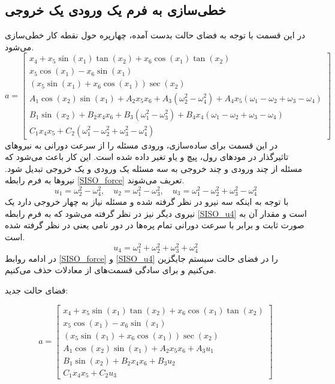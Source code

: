 \subsection{خطی‌سازی به فرم یک ورودی یک خروجی}\label{lin_SISO}
در این قسمت با توجه به فضای حالت بدست آمده، چهارپره حول نقطه کار خطی‌سازی می‌شود.
\begin{equation*}
	a = \begin{bmatrix}
		x_4 + x_5\sin(x_1)\tan(x_2) + x_6\cos(x_1)\tan(x_2)\\
		x_5\cos(x_1)- x_6\sin(x_1)\\
		(x_5\sin(x_1) + x_6\cos(x_1))\sec(x_2)\\
		A_1\cos(x_2)\sin(x_1) + 
		A_2x_5x_6 + A_3\left(\omega_2^2-\omega_4^2\right)+
		A_4x_5\left(\omega_1-\omega_2+\omega_3-\omega_4\right)\\
		B_1\sin(x_2) + 
		B_2x_4x_6 + B_3\left(\omega_1^2-\omega_3^2\right)+
		B_4x_4\left(\omega_1-\omega_2+\omega_3-\omega_4\right)\\
		C_1x_4x_5 + 
		C_2\left(\omega_1^2-\omega_2^2+\omega_3^2-\omega_4^2\right)
	\end{bmatrix}
\end{equation*} 
در این قسمت برای ساده‌سازی، ورودی مسئله را از سرعت دورانی به نیروهای تاثیرگذار در مودهای رول، پیچ و یاو تغیر داده شده است. این کار باعث می‌شود که مسئله از چند ورودی و چند خروجی به سه مسئله یک ورودی و یک خروجی تبدیل شود. نیروها به فرم رابطه 
\ref{SISO_force}
تعریف می‌شوند.
\begin{equation}\label{SISO_force}
	u_1 = \omega_2^2 - \omega_4^2, \quad
	u_2 = \omega_1^2 - \omega_3^2, \quad
	u_3 = \omega_1^2 - \omega_2^2  + \omega_3^2 - \omega_4^2
\end{equation}
با توجه به اینکه سه نیرو در نظر گرفته ‌شده و مسئله نیاز به چهار خروجی دارد یک نیروی دیگر نیز در نظر گرفته ‌می‌شود که به فرم رابطه 
\ref{SISO_u4}
است و مقدار آن به صورت ثابت و برابر با سرعت دورانی تمام پره‌ها در دور نامی یعنی
در نظر گرفته ‌شده ‌است.
\begin{equation}\label{SISO_u4}
	u_4 = \omega_1^2 + \omega_2^2  + \omega_3^2 + \omega_4^2
\end{equation}
در ادامه روابط 
\ref{SISO_force}
و
\ref{SISO_u4}
را در فضای حالت سیستم جایگزین می‌کنیم و برای سادگی قسمت‌های 
از معادلات حذف می‌کنیم.

فضای حالت جدید:

\begin{equation}
	a = \begin{bmatrix}
		x_4 + x_5\sin(x_1)\tan(x_2) + x_6\cos(x_1)\tan(x_2)\\
		x_5\cos(x_1)- x_6\sin(x_1)\\
		(x_5\sin(x_1) + x_6\cos(x_1))\sec(x_2)\\
		A_1\cos(x_2)\sin(x_1) + 
		A_2x_5x_6 + A_3u_1
		\\
		B_1\sin(x_2) + 
		B_2x_4x_6 + B_3u_2\\
		C_1x_4x_5 + 
		C_2u_3
	\end{bmatrix}
\end{equation} 


